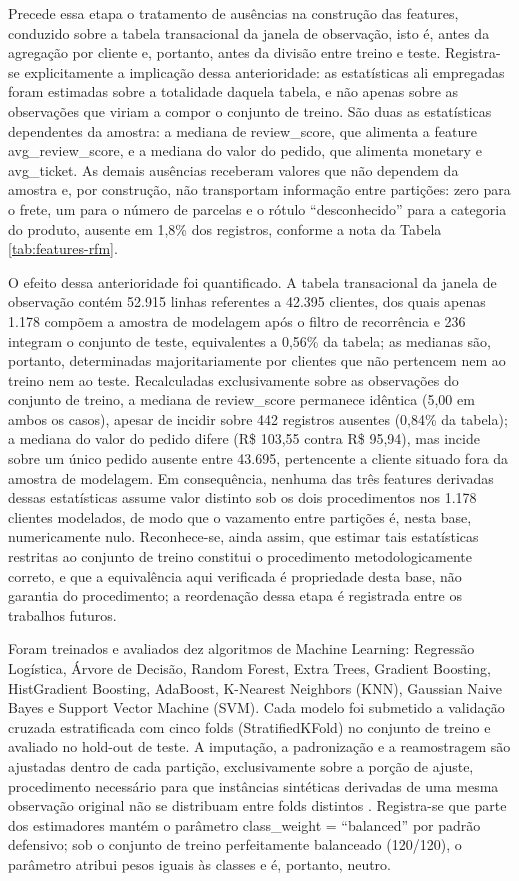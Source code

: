Precede essa etapa o tratamento de ausências na construção das features, conduzido sobre a tabela transacional da janela de observação, isto é, antes da agregação por cliente e, portanto, antes da divisão entre treino e teste. Registra-se explicitamente a implicação dessa anterioridade: as estatísticas ali empregadas foram estimadas sobre a totalidade daquela tabela, e não apenas sobre as observações que viriam a compor o conjunto de treino. São duas as estatísticas dependentes da amostra: a mediana de review\_score, que alimenta a feature avg\_review\_score, e a mediana do valor do pedido, que alimenta monetary e avg\_ticket. As demais ausências receberam valores que não dependem da amostra e, por construção, não transportam informação entre partições: zero para o frete, um para o número de parcelas e o rótulo ``desconhecido'' para a categoria do produto, ausente em 1,8\% dos registros, conforme a nota da Tabela \ref{tab:features-rfm}.

O efeito dessa anterioridade foi quantificado. A tabela transacional da janela de observação contém 52.915 linhas referentes a 42.395 clientes, dos quais apenas 1.178 compõem a amostra de modelagem após o filtro de recorrência e 236 integram o conjunto de teste, equivalentes a 0,56\% da tabela; as medianas são, portanto, determinadas majoritariamente por clientes que não pertencem nem ao treino nem ao teste. Recalculadas exclusivamente sobre as observações do conjunto de treino, a mediana de review\_score permanece idêntica (5,00 em ambos os casos), apesar de incidir sobre 442 registros ausentes (0,84\% da tabela); a mediana do valor do pedido difere (R\$ 103,55 contra R\$ 95,94), mas incide sobre um único pedido ausente entre 43.695, pertencente a cliente situado fora da amostra de modelagem. Em consequência, nenhuma das três features derivadas dessas estatísticas assume valor distinto sob os dois procedimentos nos 1.178 clientes modelados, de modo que o vazamento entre partições é, nesta base, numericamente nulo. Reconhece-se, ainda assim, que estimar tais estatísticas restritas ao conjunto de treino constitui o procedimento metodologicamente correto, e que a equivalência aqui verificada é propriedade desta base, não garantia do procedimento; a reordenação dessa etapa é registrada entre os trabalhos futuros.

Foram treinados e avaliados dez algoritmos de Machine Learning: Regressão Logística, Árvore de Decisão, Random Forest, Extra Trees, Gradient Boosting, HistGradient Boosting, AdaBoost, K-Nearest Neighbors (KNN), Gaussian Naive Bayes e Support Vector Machine (SVM). Cada modelo foi submetido a validação cruzada estratificada com cinco folds (StratifiedKFold) no conjunto de treino e avaliado no hold-out de teste. A imputação, a padronização e a reamostragem são ajustadas dentro de cada partição, exclusivamente sobre a porção de ajuste, procedimento necessário para que instâncias sintéticas derivadas de uma mesma observação original não se distribuam entre folds distintos \cite{hastie2009,kaufman2012}. Registra-se que parte dos estimadores mantém o parâmetro class\_weight = ``balanced'' por padrão defensivo; sob o conjunto de treino perfeitamente balanceado (120/120), o parâmetro atribui pesos iguais às classes e é, portanto, neutro.

